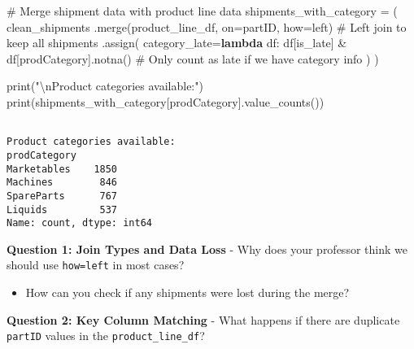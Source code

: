 \documentclass[
  letterpaper,
  DIV=11,
  numbers=noendperiod]{scrartcl}
\newenvironment{Shaded}{\begin{snugshade}}{\end{snugshade}}
\newcommand{\BuiltInTok}[1]{\textcolor[rgb]{0.00,0.23,0.31}{#1}}
\newcommand{\CharTok}[1]{\textcolor[rgb]{0.13,0.47,0.30}{#1}}
\newcommand{\CommentTok}[1]{\textcolor[rgb]{0.37,0.37,0.37}{#1}}
\newcommand{\KeywordTok}[1]{\textcolor[rgb]{0.00,0.23,0.31}{\textbf{#1}}}
\newcommand{\NormalTok}[1]{\textcolor[rgb]{0.00,0.23,0.31}{#1}}
\newcommand{\OperatorTok}[1]{\textcolor[rgb]{0.37,0.37,0.37}{#1}}
\newcommand{\StringTok}[1]{\textcolor[rgb]{0.13,0.47,0.30}{#1}}
\providecommand{\tightlist}{%
  \setlength{\itemsep}{0pt}\setlength{\parskip}{0pt}}
\begin{document}
\label{mental-model-6-merge-prep}
\begin{Shaded}
\begin{Highlighting}[]
\CommentTok{\# Merge shipment data with product line data}
\NormalTok{shipments\_with\_category }\OperatorTok{=}\NormalTok{ (}
\NormalTok{    clean\_shipments}
\NormalTok{    .merge(product\_line\_df, on}\OperatorTok{=}\StringTok{\textquotesingle{}partID\textquotesingle{}}\NormalTok{, how}\OperatorTok{=}\StringTok{\textquotesingle{}left\textquotesingle{}}\NormalTok{)  }\CommentTok{\# Left join to keep all shipments}
\NormalTok{    .assign(}
\NormalTok{        category\_late}\OperatorTok{=}\KeywordTok{lambda}\NormalTok{ df: df[}\StringTok{\textquotesingle{}is\_late\textquotesingle{}}\NormalTok{] }\OperatorTok{\&}\NormalTok{ df[}\StringTok{\textquotesingle{}prodCategory\textquotesingle{}}\NormalTok{].notna()  }\CommentTok{\# Only count as late if we have category info}
\NormalTok{    )}
\NormalTok{)}

\BuiltInTok{print}\NormalTok{(}\StringTok{"}\CharTok{\textbackslash{}n}\StringTok{Product categories available:"}\NormalTok{)}
\BuiltInTok{print}\NormalTok{(shipments\_with\_category[}\StringTok{\textquotesingle{}prodCategory\textquotesingle{}}\NormalTok{].value\_counts())}
\end{Highlighting}
\end{Shaded}

\begin{verbatim}

Product categories available:
prodCategory
Marketables    1850
Machines        846
SpareParts      767
Liquids         537
Name: count, dtype: int64
\end{verbatim}

\begin{tcolorbox}[enhanced jigsaw, colframe=quarto-callout-important-color-frame, title=\textcolor{quarto-callout-important-color}{\faExclamation}\hspace{0.5em}{🤔 Discussion Questions: Merge Mental Model}, breakable, opacityback=0, arc=.35mm, leftrule=.75mm, titlerule=0mm, left=2mm, toptitle=1mm, rightrule=.15mm, bottomtitle=1mm, bottomrule=.15mm, opacitybacktitle=0.6, toprule=.15mm, colback=white, coltitle=black, colbacktitle=quarto-callout-important-color!10!white]

\textbf{Question 1: Join Types and Data Loss} - Why does your professor
think we should use
\texttt{how=\textquotesingle{}left\textquotesingle{}} in most cases?

\begin{itemize}
\tightlist
\item
  How can you check if any shipments were lost during the merge?
\end{itemize}

\textbf{Question 2: Key Column Matching} - What happens if there are
duplicate \texttt{partID} values in the \texttt{product\_line\_df}?

\end{tcolorbox}
\end{document}
